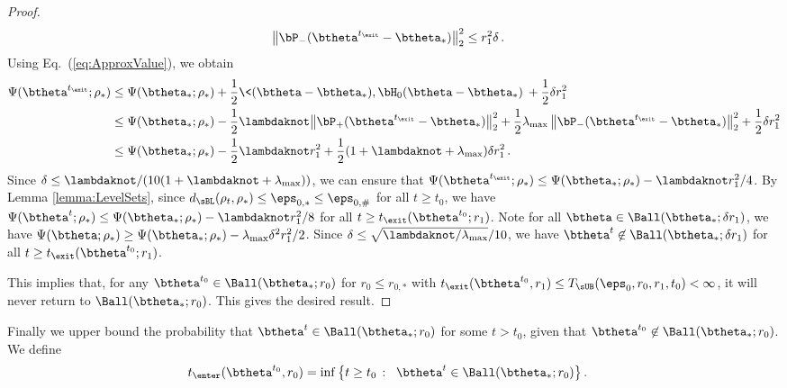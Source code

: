 \documentclass[11pt]{article}
\begin{document}
\begin{proof}
\begin{align}
\big\|\bP_-(\btheta^{t_{\exit}}-\btheta_*)\big\|_2^2&\le r_1^2\delta \,. 
%
\end{align}
Using Eq.~(\ref{eq:ApproxValue}), we obtain
%
\begin{align}
%
\Psi(\btheta^{t_{\exit}};\rho_*)&\le \Psi(\btheta_*;\rho_*) + \frac{1}{2}\<(\btheta-\btheta_*),\bH_0(\btheta-\btheta_*)\> +\frac{1}{2}\delta r_1^2\\
&\le   \Psi(\btheta_*;\rho_*) - \frac{1}{2} \lambdaknot \big\|\bP_+(\btheta^{t_{\exit}}-\btheta_*)\big\|_2^2+\frac{1}{2}\lambda_{\max}
\, \big\|\bP_-(\btheta^{t_{\exit}}-\btheta_*)\big\|_2^2 +\frac{1}{2}\delta r_1^2\\
& \le \Psi(\btheta_*;\rho_*) -\frac{1}{2} \lambdaknot r_1^2+ \frac{1}{2}(1 + \lambdaknot + \lambda_{\max})\delta r_1^2\, .
%
\end{align}
%
Since $\delta \le \lambdaknot/(10(1 + \lambdaknot + \lambda_{\max}))$, we can ensure that $\Psi(\btheta^{t_{\exit}};\rho_*)\le  \Psi(\btheta_*;\rho_*) - \lambdaknot r_1^2/4$. By Lemma \ref{lemma:LevelSets}, since $d_{\sBL}(\rho_t, \rho_*) \le \eps_{0, *} \le \eps_{0, \#}$ for all $t \ge t_0$, we have $\Psi(\btheta^t; \rho_*) \le \Psi(\btheta_*;\rho_*) - \lambdaknot r_1^2/8$ for all $t \ge t_{\exit}(\btheta^{t_0}; r_1)$. Note for all $\btheta \in \Ball(\btheta_*; \delta r_1)$, we have $\Psi(\btheta; \rho_*) \ge  \Psi(\btheta_*;\rho_*) - \lambda_{\max} \delta^2 r_1^2/2$. Since $\delta \le \sqrt{\lambdaknot/\lambda_{\max}}/10$, we have $\btheta^t \not\in\Ball(\btheta_*; \delta r_1)$ for all $t \ge t_{\exit}(\btheta^{t_0};r_1)$. 

This implies that, for any $\btheta^{t_0} \in \Ball(\btheta_*;r_0)$ for $r_0 \le r_{0, *}$ with $t_{\exit}(\btheta^{t_0},r_1) \le T_{\sUB}(\eps_0,r_0,r_1, t_0) < \infty$, it will never return to $\Ball(\btheta_*; r_0)$. This gives the desired result. 
\end{proof}

Finally we upper bound the probability that $\btheta^t\in\Ball(\btheta_*;r_0)$ for some $t > t_0$, given that 
$\btheta^{t_0}\not \in\Ball(\btheta_*;r_0)$. We define
%
\begin{align}
%
t_{\enter}(\btheta^{t_0},r_0) & = \inf\big\{t\ge t_0\,:\;\; \btheta^t\in \Ball(\btheta_*;r_0)\big\}\, .
%
\end{align}
\end{document}
